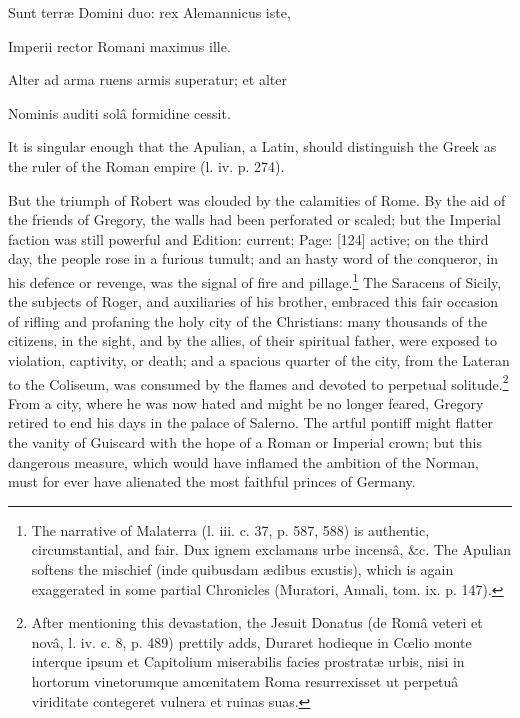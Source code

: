 {Sunt terræ Domini duo: rex Alemannicus iste,

Imperii rector Romani maximus ille.

Alter ad arma ruens armis superatur; et alter

Nominis auditi solâ formidine cessit.

It is singular enough that the Apulian, a Latin, should distinguish the Greek as the ruler of the Roman empire (l. iv. p. 274).} But the triumph of Robert was clouded by the calamities of Rome. By the aid of the friends of Gregory, the walls had been perforated or scaled; but the Imperial faction was still powerful and Edition: current; Page: [124] active; on the third day, the people rose in a furious tumult; and an hasty word of the conqueror, in his defence or revenge, was the signal of fire and pillage.\footnote{The narrative of Malaterra (l. iii. c. 37, p. 587, 588) is authentic, circumstantial, and fair. Dux ignem exclamans urbe incensâ, \&c. The Apulian softens the mischief (inde quibusdam ædibus exustis), which is again exaggerated in some partial Chronicles (Muratori, Annali, tom. ix. p. 147).} The Saracens of Sicily, the subjects of Roger, and auxiliaries of his brother, embraced this fair occasion of rifling and profaning the holy city of the Christians: many thousands of the citizens, in the sight, and by the allies, of their spiritual father, were exposed to violation, captivity, or death; and a spacious quarter of the city, from the Lateran to the Coliseum, was consumed by the flames and devoted to perpetual solitude.\footnote{After mentioning this devastation, the Jesuit Donatus (de Româ veteri et novâ, l. iv. c. 8, p. 489) prettily adds, Duraret hodieque in Cœlio monte interque ipsum et Capitolium miserabilis facies prostratæ urbis, nisi in hortorum vinetorumque amœnitatem Roma resurrexisset ut perpetuâ viriditate contegeret vulnera et ruinas suas.} From a city, where he was now hated and might be no longer feared, Gregory retired to end his days in the palace of Salerno. The artful pontiff might flatter the vanity of Guiscard with the hope of a Roman or Imperial crown; but this dangerous measure, which would have inflamed the ambition of the Norman, must for ever have alienated the most faithful princes of Germany.

